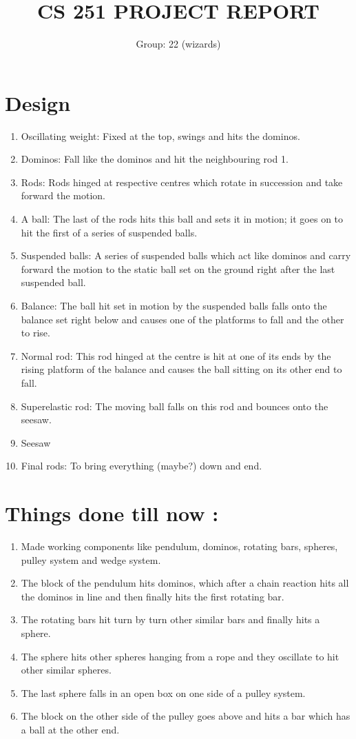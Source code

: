 \documentclass{article}
\begin{document}
\title{CS 251 PROJECT REPORT}
\author{Group: 22 (wizards)}
\maketitle

\section*{Design}
\begin{enumerate}
\item Oscillating weight: Fixed at the top, swings and hits the dominos.
\item Dominos: Fall like the dominos and hit the neighbouring rod 1.
\item Rods: Rods hinged at respective centres which rotate in succession and take forward the motion.
\item A ball: The last of the rods hits this ball and sets it in motion; it goes on to hit the first of a series of suspended balls.
\item Suspended balls: A series of suspended balls which act like dominos and carry forward the motion to the static ball set on the ground right after the last suspended ball.
\item Balance: The ball hit set in motion by the suspended balls falls onto the balance set right below and causes one of the platforms to fall and the other to rise.
\item Normal rod: This rod hinged at the centre is hit at one of its ends by the rising platform of the balance and causes the ball sitting on its other end to fall.
\item Superelastic rod: The moving ball falls on this rod and bounces onto the seesaw.
\item Seesaw
\item Final rods: To bring everything (maybe?) down and end.
\end{enumerate}
\newpage
\section*{Things done till now :}
\begin{enumerate}
\item[] Made working components like pendulum, dominos, rotating bars, spheres, pulley system and wedge system.
\item[] The block of the pendulum hits dominos, which after a chain reaction hits all the dominos in line and then finally hits the first rotating bar.
\item[] The rotating bars hit turn by turn other similar bars and finally hits a sphere.
\item[] The sphere hits other spheres hanging from a rope and they oscillate to hit other similar spheres.
\item[] The last sphere falls in an open box on one side of a pulley system.
\item[] The block on the other side of the pulley goes above and hits a bar which has a ball at the other end.
\end{enumerate}
\end{document}
